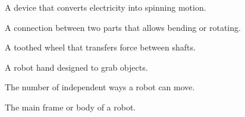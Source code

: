 \sectionrule
\begin{newwords}
  \begin{description}[labelwidth=3.8cm, leftmargin=4.0cm]
    \item[Motor] A device that converts electricity into spinning motion.
    \item[Joint] A connection between two parts that allows bending or rotating.
    \item[Gear] A toothed wheel that transfers force between shafts.
    \item[Gripper] A robot hand designed to grab objects.
    \item[Degrees of freedom] The number of independent ways a robot can move.
    \item[Chassis] The main frame or body of a robot.
  \end{description}
\end{newwords}

